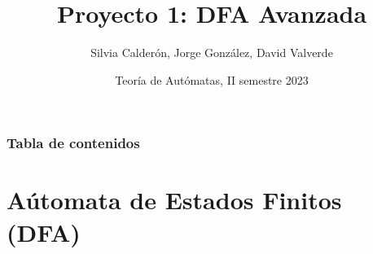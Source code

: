 \documentclass[xcolor=table]{beamer}
\title[Proyecto 1: DFA - Avanzada] %
{Proyecto 1: DFA Avanzada}
\author[ Silvia Calderón, Jorge González, David Valverde]
{Silvia Calderón, Jorge González, David Valverde}
\date[Noviembre 2023] %
{Teoría de Autómatas, II semestre 2023}
\begin{document}
\frame{\titlepage}


\begin{frame}
\frametitle{Tabla de contenidos}
\tableofcontents
\end{frame}


\section{Aútomata de Estados Finitos (DFA)}


\end{document}
